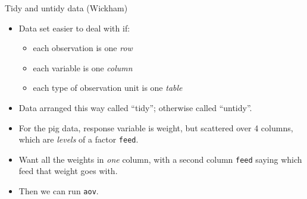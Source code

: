 \documentclass[unknownkeysallowed]{beamer}\usepackage[]{graphicx}\usepackage[]{color}
\begin{document}
  
  \begin{frame}[fragile]{Tidy and untidy data (Wickham)}
  
  \begin{itemize}
  \item Data set easier to deal with if:
    \begin{itemize}
    \item each observation is one \emph{row}
    \item each variable is one \emph{column}
    \item each type of observation unit is one \emph{table}
    \end{itemize}

  \item Data arranged this way called ``tidy''; otherwise called
    ``untidy''.
  \item For the pig data, response variable is weight, but scattered
    over 4 columns, which are \emph{levels} of a factor \texttt{feed}.
  \item Want all the weights in \emph{one} column, with a second
    column \texttt{feed} saying which feed that weight goes with.
  \item Then we can run \texttt{aov}.
    
    

    
  \end{itemize}

  

  
\end{frame}
\end{document}
